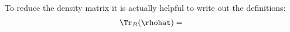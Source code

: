 To reduce the density matrix it is actually helpful to write out the definitions:
\begin{align}
\Tr_B(\rhohat) = \
\end{align}